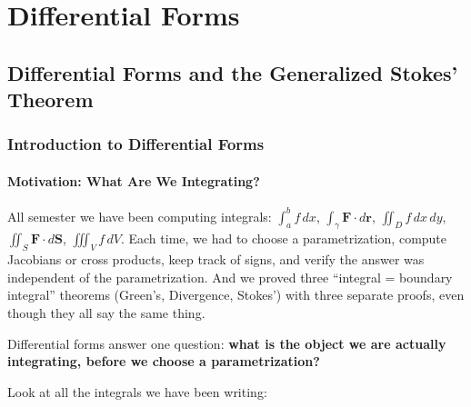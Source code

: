 \documentclass[11pt]{report}
\begin{document}
\newpage
\part{Differential Forms}

\chapter{Differential Forms and the Generalized Stokes' Theorem}

\section{Introduction to Differential Forms}

\subsection{Motivation: What Are We Integrating?}

All semester we have been computing integrals: $\int_a^b f\,dx$, $\int_\gamma \mathbf{F}\cdot d\mathbf{r}$, $\iint_D f\,dx\,dy$, $\iint_S \mathbf{F}\cdot d\mathbf{S}$, $\iiint_V f\,dV$. Each time, we had to choose a parametrization, compute Jacobians or cross products, keep track of signs, and verify the answer was independent of the parametrization. And we proved three ``integral = boundary integral'' theorems (Green's, Divergence, Stokes') with three separate proofs, even though they all say the same thing.

Differential forms answer one question: \textbf{what is the object we are actually integrating, before we choose a parametrization?}

Look at all the integrals we have been writing:
\end{document}
